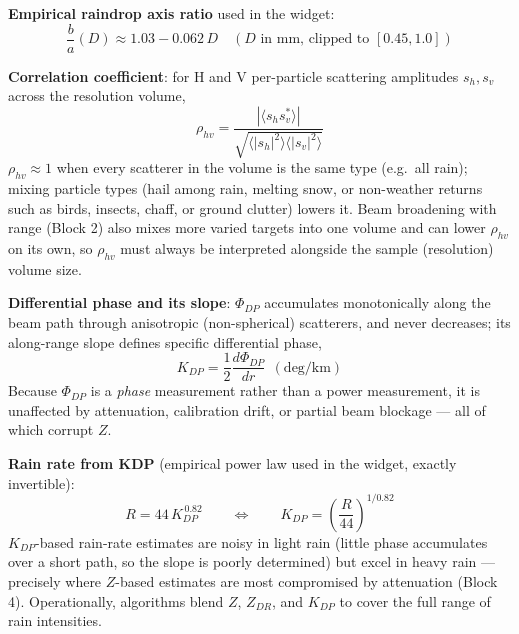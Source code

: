 \documentclass[11pt]{article}
\begin{document}
\textbf{Empirical raindrop axis ratio} used in the widget:
\begin{equation}
\frac{b}{a}(D) \approx 1.03 - 0.062\,D\quad(D\text{ in mm, clipped to }[0.45,1.0])
\end{equation}

\textbf{Correlation coefficient}: for H and V per-particle scattering amplitudes $s_h, s_v$ across the resolution volume,
\begin{equation}
\rho_{hv} = \frac{\left|\langle s_h s_v^{*}\rangle\right|}{\sqrt{\langle|s_h|^2\rangle\langle|s_v|^2\rangle}}
\end{equation}
$\rho_{hv}\approx1$ when every scatterer in the volume is the same type (e.g.\ all rain); mixing particle types (hail among rain, melting snow, or non-weather returns such as birds, insects, chaff, or ground clutter) lowers it. Beam broadening with range (Block 2) also mixes more varied targets into one volume and can lower $\rho_{hv}$ on its own, so $\rho_{hv}$ must always be interpreted alongside the sample (resolution) volume size.

\textbf{Differential phase and its slope}: $\Phi_{DP}$ accumulates monotonically along the beam path through anisotropic (non-spherical) scatterers, and never decreases; its along-range slope defines specific differential phase,
\begin{equation}
K_{DP} = \frac{1}{2}\frac{d\Phi_{DP}}{dr}\ \ (\text{deg/km})
\end{equation}
Because $\Phi_{DP}$ is a \emph{phase} measurement rather than a power measurement, it is unaffected by attenuation, calibration drift, or partial beam blockage --- all of which corrupt $Z$.

\textbf{Rain rate from KDP} (empirical power law used in the widget, exactly invertible):
\begin{equation}
R = 44\,K_{DP}^{\,0.82} \qquad\Longleftrightarrow\qquad K_{DP} = \left(\frac{R}{44}\right)^{1/0.82}
\end{equation}
$K_{DP}$-based rain-rate estimates are noisy in light rain (little phase accumulates over a short path, so the slope is poorly determined) but excel in heavy rain --- precisely where $Z$-based estimates are most compromised by attenuation (Block 4). Operationally, algorithms blend $Z$, $Z_{DR}$, and $K_{DP}$ to cover the full range of rain intensities.
\end{document}
